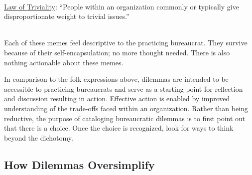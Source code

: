 \ \\
\href{https://en.wikipedia.org/wiki/Law_of_triviality}{Law of Triviality}:
``People within an organization commonly or typically give disproportionate weight to trivial issues.''

\ \\

Each of these memes feel descriptive to the practicing bureaucrat. They survive because of their self-encapsulation; no more thought needed. There is also nothing actionable about these memes.

In comparison to the folk expressions above, dilemmas are intended to be accessible to practicing bureaucrats and serve as a starting point for reflection and discussion resulting in action. Effective action is enabled by improved understanding of the trade-offs faced within an organization. Rather than being reductive, the purpose of cataloging bureaucratic dilemmas is to first point out that there is a choice. Once the choice is recognized, look for ways to think beyond the dichotomy.

\subsection*{How Dilemmas Oversimplify}


